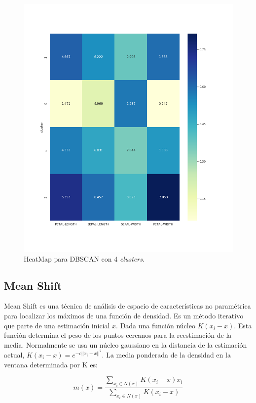 \documentclass[a4paper, 20pt]{article}
\begin{document}
{\begin{figure}[h]
\centering
\includegraphics[scale=0.62]{dani/heatmapDBSCANIRIS.png}
\caption{HeatMap para DBSCAN con 4 \textit{clusters}.}
\label{hmdb}
\end{figure}

\clearpage

\subsection{Mean Shift}

Mean Shift es una técnica de análisis de espacio de características no paramétrica para localizar los máximos de una función de densidad. Es un método iterativo que parte de una estimación inicial $x$. Dada una función núcleo $K(x_i-x)$. Esta función determina el peso de los puntos cercanos para la reestimación de la media. Normalmente se usa un núcleo gaussiano en la distancia de la estimación actual, $K(x_i-x)=e^{-c||x_i-x||^2}$. La media ponderada de la densidad en la ventana determinada por K es:

$$m(x)=\dfrac{\sum_{x_i\in N(x)}K(x_i-x)x_i}{\sum_{x_i\in N(x)}K(x_i-x)}$$

}
\end{document}
